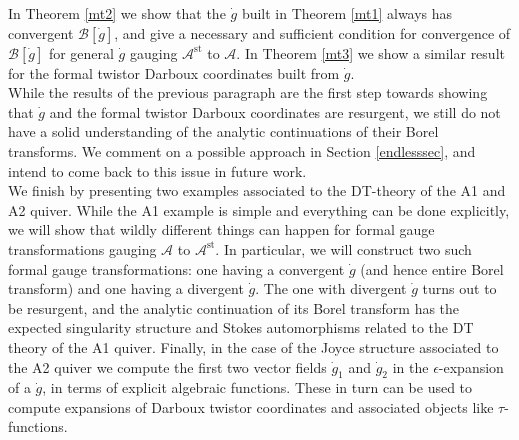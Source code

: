 \documentclass{article}
\theoremstyle{definition}
\numberwithin{equation}{section}
\begin{document}
In Theorem \ref{mt2} we show that the $\dot{g}$ built in Theorem \ref{mt1} always has convergent $\mathcal{B}[\dot{g}]$, and give a necessary and sufficient condition for convergence of $\mathcal{B}[\dot{g}]$ for general $\dot{g}$ gauging $\mathcal{A}^{\text{st}}$ to $\mathcal{A}$. In Theorem \ref{mt3} we show a similar result for the formal twistor Darboux coordinates built from $\dot{g}$. \\

While the results of the previous paragraph are the first step towards showing that $\dot{g}$ and the formal twistor Darboux coordinates are resurgent,  we still do not have a solid understanding of the analytic continuations of their Borel transforms. We comment on a possible approach in Section \ref{endlesssec}, and intend to come back to this issue in future work. \\

We finish by presenting two examples associated to the DT-theory of the A1 and A2 quiver. While the A1 example is simple and everything can be done explicitly, we will show that wildly different things can happen for formal gauge transformations gauging $\mathcal{A}$ to $\mathcal{A}^{\text{st}}$. In particular, we will construct two such formal gauge transformations: one having a convergent $\dot{g}$ (and hence entire Borel transform) and one having a divergent $\dot{g}$. The one with divergent $\dot{g}$ turns out to be resurgent, and the analytic continuation of its Borel transform has the expected singularity structure and Stokes automorphisms related to the DT theory of the A1 quiver. Finally, in the case of the Joyce structure associated to the A2 quiver we compute the first two vector fields $\dot{g}_1$ and $\dot{g}_2$ in the $\epsilon$-expansion of a $\dot{g}$, in terms of explicit algebraic functions. These in turn can be used to compute expansions of Darboux twistor coordinates and associated objects like $\tau$-functions. 
\end{document}
